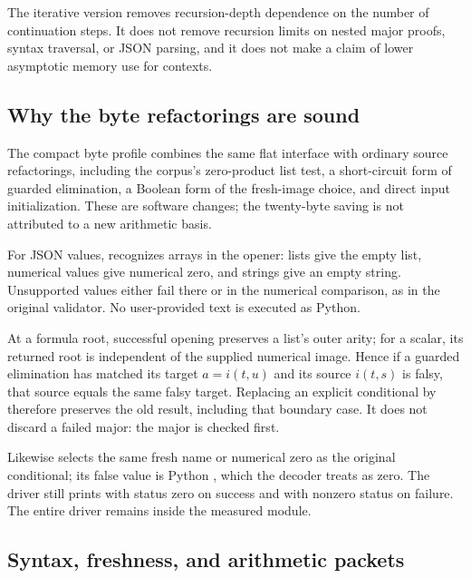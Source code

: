 The iterative version removes recursion-depth dependence on the
number of continuation steps. It does not remove recursion limits
on nested major proofs, syntax traversal, or JSON parsing, and it
does not make a claim of lower asymptotic memory use for contexts.

\subsection{Why the byte refactorings are sound}

The compact byte profile combines the same flat interface with
ordinary source refactorings, including the corpus's zero-product
list test, a short-circuit form of guarded elimination, a Boolean
form of the fresh-image choice, and direct input initialization.
These are software changes; the twenty-byte saving is not attributed
to a new arithmetic basis.

For JSON values,  recognizes arrays in the opener:
lists give the empty list, numerical values give numerical zero,
and strings give an empty string. Unsupported values either fail
there or in the numerical comparison, as in the original validator.
No user-provided text is executed as Python.

At a formula root, successful opening preserves a list's outer arity;
for a scalar, its returned root is independent of the supplied
numerical image. Hence if a guarded elimination has matched its
target $a=i(t,u)$ and its source $i(t,s)$ is falsy, that source
equals the same falsy target. Replacing an explicit conditional by
 therefore preserves the old result,
including that boundary case. It does not discard a failed major:
the major is checked first.

Likewise  selects the same
fresh name or numerical zero as the original conditional; its false
value is Python , which the decoder treats as zero.
The driver still prints  with status zero on success
and  with nonzero status on failure. The entire
driver remains inside the measured module.

\subsection{Syntax, freshness, and arithmetic packets}

